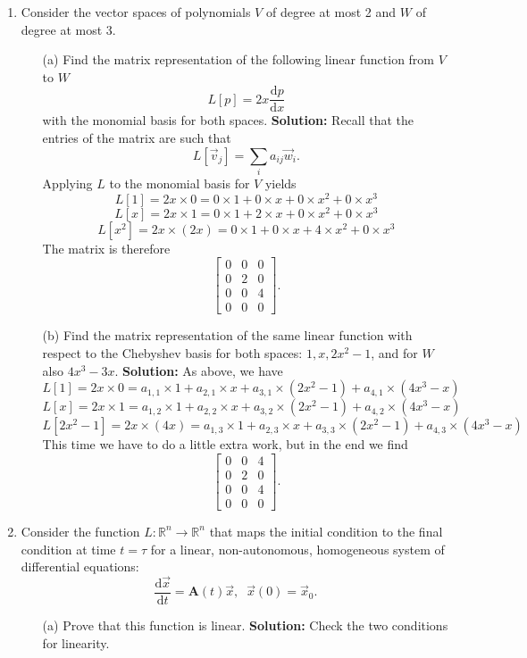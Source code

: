 \documentclass[11pt,fleqn]{article}
\begin{document}
\begin{enumerate}
\item Consider the vector spaces of polynomials $V$ of degree at most 2 and $W$ of degree at most 3. 
	\begin{itemize}
	\item[(a)] Find the matrix representation of the following linear function from $V$ to $W$
	\[L[p] = 2x\frac{\mathrm{d}p}{\mathrm{d}x}\]
	with the monomial basis for both spaces.
	{\bf Solution:} Recall that the entries of the matrix are such that
	\[L[\vec{v}_j] = \sum_i a_{ij}\vec{w}_i.\]
	Applying $L$ to the monomial basis for $V$ yields
	\[L[1] = 2x\times0 = 0\times 1 + 0\times x + 0\times x^2 + 0\times x^3\]
	\[L[x] = 2x\times1 = 0\times 1 + 2\times x + 0\times x^2 + 0\times x^3\]
	\[L[x^2] = 2x\times(2x) = 0\times 1 + 0\times x + 4\times x^2 + 0\times x^3\]
	The matrix is therefore
	\[\left[\begin{array}{ccc}0&0&0\\0&2&0\\0&0&4\\0&0&0\end{array}\right].\]
	\item[(b)] Find the matrix representation of the same linear function with respect to the Chebyshev basis for both spaces: $1, x, 2x^2 - 1$, and for $W$ also $4x^3-3x$.
	{\bf Solution:} As above, we have
	\[L[1] = 2x\times0 = a_{1,1}\times 1 + a_{2,1}\times x + a_{3,1}\times (2x^2-1) + a_{4,1}\times (4x^3-x)\]
	\[L[x] = 2x\times1 = a_{1,2}\times 1 + a_{2,2}\times x + a_{3,2}\times (2x^2-1) + a_{4,2}\times (4x^3-x)\]
	\[L[2x^2-1] = 2x\times(4x) = a_{1,3}\times 1 + a_{2,3}\times x + a_{3,3}\times (2x^2-1) + a_{4,3}\times (4x^3-x)\]
	This time we have to do a little extra work, but in the end we find
	\[\left[\begin{array}{ccc}0&0&4\\0&2&0\\0&0&4\\0&0&0\end{array}\right].\]
	\end{itemize}
\item Consider the function $L:\mathbb{R}^n\to\mathbb{R}^n$ that maps the initial condition to the final condition at time $t=\tau$ for a linear, non-autonomous, homogeneous system of differential equations:
\[\frac{\mathrm{d}\vec{x}}{\mathrm{d}t} = \mathbf{A}(t)\vec{x},\;\;\vec{x}(0) = \vec{x}_0.\]
	\begin{itemize}
	\item[(a)] Prove that this function is linear. {\bf Solution:} Check the two conditions for linearity.

\end{itemize}
\end{enumerate}
\end{document}
